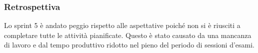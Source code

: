 \subsubsection{Retrospettiva}
\label{sec:sprint5_retrospettiva}
Lo sprint 5 è andato peggio rispetto alle aspettative poiché non si è riusciti a completare tutte le attività pianificate. Questo è stato causato da una mancanza di lavoro e dal tempo produttivo ridotto nel pieno del periodo di sessioni d'esami. 